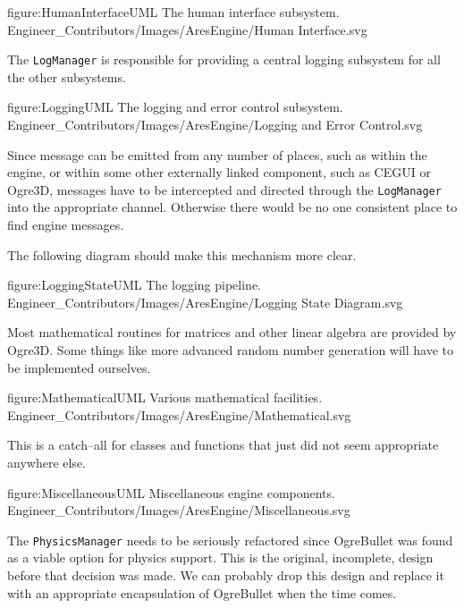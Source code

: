 \FullPageDiagram
    {figure:HumanInterfaceUML}
    {The human interface subsystem.}
    {Engineer_Contributors/Images/AresEngine/Human Interface.svg}

\page 
{}
The {\tt LogManager} is responsible for providing a central logging subsystem for all the other subsystems.

\FullPageDiagram
    {figure:LoggingUML}
    {The logging and error control subsystem.}
    {Engineer_Contributors/Images/AresEngine/Logging and Error Control.svg}
    
Since message can be emitted from any number of places, such as within the engine, or within some other externally linked component, such as CEGUI or Ogre3D, messages have to be intercepted and directed through the {\tt LogManager} into the appropriate channel. Otherwise there would be no one consistent place to find engine messages. 

The following diagram should make this mechanism more clear.

\FullPageDiagram
    {figure:LoggingStateUML}
    {The logging pipeline.}
    {Engineer_Contributors/Images/AresEngine/Logging State Diagram.svg}

\page 
{}
Most mathematical routines for matrices and other linear algebra are provided by Ogre3D. Some things like more advanced random number generation will have to be implemented ourselves.

\FullPageDiagram
    {figure:MathematicalUML}
    {Various mathematical facilities.}
    {Engineer_Contributors/Images/AresEngine/Mathematical.svg}

\page 
{}
This is a catch--all for classes and functions that just did not seem appropriate anywhere else.

\FullPageDiagram
    {figure:MiscellaneousUML}
    {Miscellaneous engine components.}
    {Engineer_Contributors/Images/AresEngine/Miscellaneous.svg}

\page 
{}
The {\tt PhysicsManager} needs to be seriously refactored since OgreBullet was found as a viable option for physics support. This is the original, incomplete, design before that decision was made. We can probably drop this design and replace it with an appropriate encapsulation of OgreBullet when the time comes.

